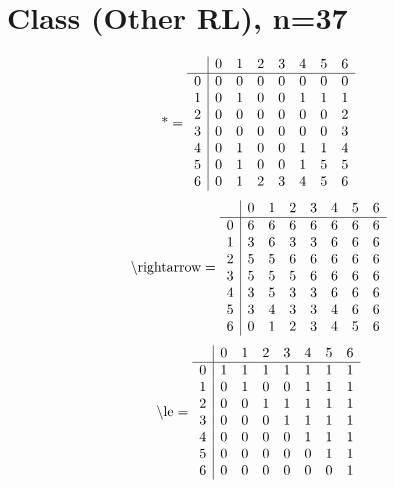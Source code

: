 \documentclass[11pt]{article}
\begin{document}
\section{Class (Other RL), n=37}
\[\text{*} = 
\begin{array}{r | r r r r r r r}
 & 0 & 1 & 2 & 3 & 4 & 5 & 6 \\ \hline
0 & 0 & 0 & 0 & 0 & 0 & 0 & 0 \\
1 & 0 & 1 & 0 & 0 & 1 & 1 & 1 \\
2 & 0 & 0 & 0 & 0 & 0 & 0 & 2 \\
3 & 0 & 0 & 0 & 0 & 0 & 0 & 3 \\
4 & 0 & 1 & 0 & 0 & 1 & 1 & 4 \\
5 & 0 & 1 & 0 & 0 & 1 & 5 & 5 \\
6 & 0 & 1 & 2 & 3 & 4 & 5 & 6 \\
\end{array}
\]
\[\text{\textbackslash rightarrow} = 
\begin{array}{r | r r r r r r r}
 & 0 & 1 & 2 & 3 & 4 & 5 & 6 \\ \hline
0 & 6 & 6 & 6 & 6 & 6 & 6 & 6 \\
1 & 3 & 6 & 3 & 3 & 6 & 6 & 6 \\
2 & 5 & 5 & 6 & 6 & 6 & 6 & 6 \\
3 & 5 & 5 & 5 & 6 & 6 & 6 & 6 \\
4 & 3 & 5 & 3 & 3 & 6 & 6 & 6 \\
5 & 3 & 4 & 3 & 3 & 4 & 6 & 6 \\
6 & 0 & 1 & 2 & 3 & 4 & 5 & 6 \\
\end{array}
\]
\[\text{\textbackslash le} = 
\begin{array}{r | r r r r r r r}
 & 0 & 1 & 2 & 3 & 4 & 5 & 6 \\ \hline
0 & 1 & 1 & 1 & 1 & 1 & 1 & 1 \\
1 & 0 & 1 & 0 & 0 & 1 & 1 & 1 \\
2 & 0 & 0 & 1 & 1 & 1 & 1 & 1 \\
3 & 0 & 0 & 0 & 1 & 1 & 1 & 1 \\
4 & 0 & 0 & 0 & 0 & 1 & 1 & 1 \\
5 & 0 & 0 & 0 & 0 & 0 & 1 & 1 \\
6 & 0 & 0 & 0 & 0 & 0 & 0 & 1 \\
\end{array}
\]
\end{document}
